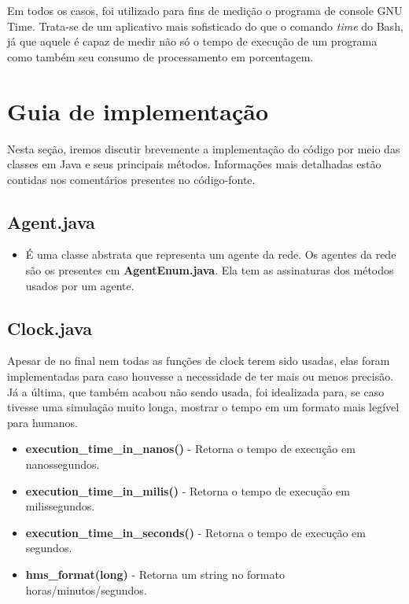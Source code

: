 \documentclass[11pt]{article}
\begin{document}
Em todos os casos, foi utilizado para fins de medição o programa de console GNU Time. Trata-se de um aplicativo mais sofisticado do que o comando \textit{time} do Bash, já que aquele é capaz de medir não só o tempo de execução de um programa como também seu consumo de processamento em porcentagem.


\section{Guia de implementação}

Nesta seção, iremos discutir brevemente a implementação do código por meio das classes em Java e seus principais métodos. Informações mais detalhadas estão contidas nos comentários presentes no código-fonte.

\subsection{Agent.java}

\begin{itemize}
	\item É uma classe abstrata que representa um agente da rede. Os agentes da rede são os presentes em \textbf{AgentEnum.java}. Ela tem as assinaturas dos métodos usados por um agente.
\end{itemize}

\subsection{Clock.java}

Apesar de no final nem todas as funções de clock terem sido usadas, elas foram implementadas para caso houvesse a necessidade de ter mais ou menos precisão. Já a última, que também acabou não sendo usada, 
foi idealizada para, se caso tivesse uma simulação muito longa, mostrar o tempo em um formato mais legível para humanos.
\begin{itemize}
	\item \textbf{execution\_time\_in\_nanos()} - Retorna o tempo de execução em nanossegundos.
	\item \textbf{execution\_time\_in\_milis()} - Retorna o tempo de execução em milissegundos.
	\item \textbf{execution\_time\_in\_seconds()} - Retorna o tempo de execução em segundos.
	\item \textbf{hms\_format(long)} - Retorna um string no formato horas/minutos/segundos.
\end{itemize}
\end{document}
